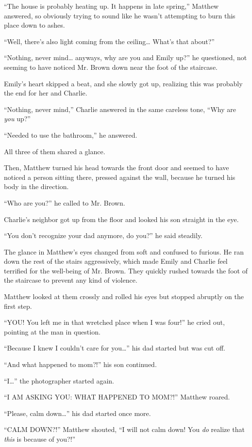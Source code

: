“The house is probably heating up. It happens in late spring,” Matthew answered, so obviously trying to sound like he wasn't attempting to burn this place down to ashes.

“Well, there's also light coming from the ceiling… What's that about?”

“Nothing, never mind… anyways, why are you and Emily up?” he questioned, not seeming to have noticed Mr. Brown down near the foot of the staircase.

Emily's heart skipped a beat, and she slowly got up, realizing this was probably the end for her and Charlie.

“Nothing, never mind,” Charlie answered in the same careless tone, “Why are \textit{you} up?”

“Needed to use the bathroom,” he answered.

All three of them shared a glance.

Then, Matthew turned his head towards the front door and seemed to have noticed a person sitting there, pressed against the wall, because he turned his body in the direction.

“Who are you?” he called to Mr. Brown.

Charlie's neighbor got up from the floor and looked his son straight in the eye.

“You don't recognize your dad anymore, do you?” he said steadily.

The glance in Matthew's eyes changed from soft and confused to furious. He ran down the rest of the stairs aggressively, which made Emily and Charlie feel terrified for the well-being of Mr. Brown. They quickly rushed towards the foot of the staircase to prevent any kind of violence.

Matthew looked at them crossly and rolled his eyes but stopped abruptly on the first step.

“YOU! You left me in that wretched place when I was four!” he cried out, pointing at the man in question.

“Because I knew I couldn't care for you…” his dad started but was cut off.

“And what happened to mom?!” his son continued.

“I…” the photographer started again.

“I AM ASKING YOU: WHAT HAPPENED TO MOM?!” Matthew roared.

“Please, calm down…” his dad started once more.

“CALM DOWN?!” Matthew shouted, “I will not calm down! You \textit{do} realize that \textit{this} is because of you?!”


